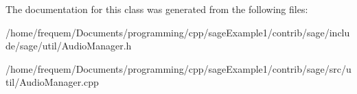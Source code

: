 The documentation for this class was generated from the following files\+:\begin{DoxyCompactItemize}
\item 
/home/frequem/\+Documents/programming/cpp/sage\+Example1/contrib/sage/include/sage/util/Audio\+Manager.\+h\item 
/home/frequem/\+Documents/programming/cpp/sage\+Example1/contrib/sage/src/util/Audio\+Manager.\+cpp\end{DoxyCompactItemize}
